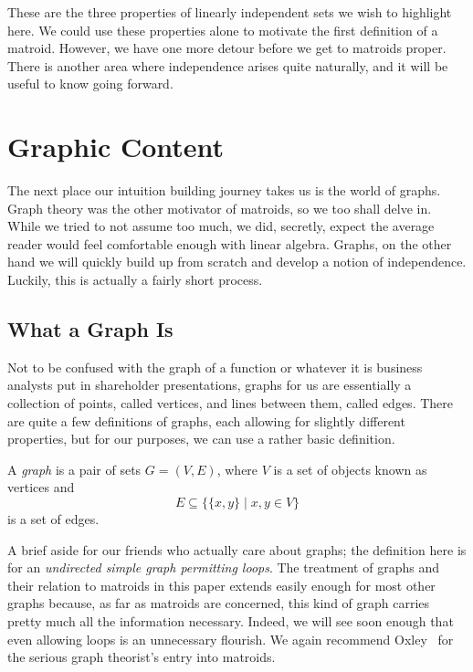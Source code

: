 \documentclass[12pt,oneside]{../../sfsuthesis}
\begin{document}
These are the three properties of linearly independent sets we wish to highlight here.
We could use these properties alone to motivate the first definition of a matroid.
However, we have one more detour before we get to matroids proper.
There is another area where independence arises quite naturally, and it will be useful to know going forward.

\section{Graphic Content}

The next place our intuition building journey takes us is the world of graphs.
Graph theory was the other motivator of matroids, so we too shall delve in.
While we tried to not assume too much, we did, secretly, expect the average reader would feel comfortable enough with linear algebra.
Graphs, on the other hand we will quickly build up from scratch and develop a notion of independence.
Luckily, this is actually a fairly short process.

\subsection{What a Graph Is}
Not to be confused with the graph of a function or whatever it is business analysts put in shareholder presentations, graphs for us are essentially a collection of points, called vertices, and lines between them, called edges.
There are quite a few definitions of graphs, each allowing for slightly different properties, but for our purposes, we can use a rather basic definition.
\begin{definition}[Graph]\label{def:graph}

    A \emph{graph} is a pair of sets \( G = (V, E) \), where \( V \) is a set of objects known as vertices and
    \[
        E \subseteq \big\{ \{x, y\} \; | \; x, y \in V \big\}
    \]
    is a set of edges.
\end{definition}
A brief aside for our friends who actually care about graphs;
the definition here is for an \emph{undirected simple graph permitting loops}.
The treatment of graphs and their relation to matroids in this paper extends easily enough for most other graphs because, as far as matroids are concerned, this kind of graph carries pretty much all the information necessary.
Indeed, we will see soon enough that even allowing loops is an unnecessary flourish.
We again recommend Oxley~\cite{oxleyMatroidTheory2011} for the serious graph theorist's entry into matroids.
\end{document}
